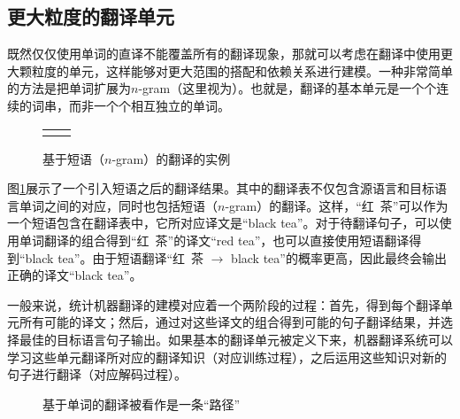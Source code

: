 
\subsection{更大粒度的翻译单元}

\parinterval 既然仅仅使用单词的直译不能覆盖所有的翻译现象，那就可以考虑在翻译中使用更大颗粒度的单元，这样能够对更大范围的搭配和依赖关系进行建模。一种非常简单的方法是把单词扩展为$n$-gram（这里视为{\small{}}）。也就是，翻译的基本单元是一个个连续的词串，而非一个个相互独立的单词。

\begin{figure}[htp]
\centering
\begin{tabular}{l r}
\subfigure{} & \subfigure{} \\
\end{tabular}
\caption{基于短语（$n$-gram）的翻译的实例}
\label{fig:4-3}
\end{figure}

\parinterval 图\ref{fig:4-3}展示了一个引入短语之后的翻译结果。其中的翻译表不仅包含源语言和目标语言单词之间的对应，同时也包括短语（$n$-gram）的翻译。这样，``红\ 茶''可以作为一个短语包含在翻译表中，它所对应译文是``black tea''。对于待翻译句子，可以使用单词翻译的组合得到``红\ 茶''的译文``red tea''，也可以直接使用短语翻译得到``black tea''。由于短语翻译``红\ 茶 $\to$ black tea''的概率更高，因此最终会输出正确的译文``black tea''。

\parinterval 一般来说，统计机器翻译的建模对应着一个两阶段的过程：首先，得到每个翻译单元所有可能的译文；然后，通过对这些译文的组合得到可能的句子翻译结果，并选择最佳的目标语言句子输出。如果基本的翻译单元被定义下来，机器翻译系统可以学习这些单元翻译所对应的翻译知识（对应训练过程），之后运用这些知识对新的句子进行翻译（对应解码过程）。

\begin{figure}[htp]
\centering

\caption{基于单词的翻译被看作是一条``路径''}
\label{fig:4-4}
\end{figure}

